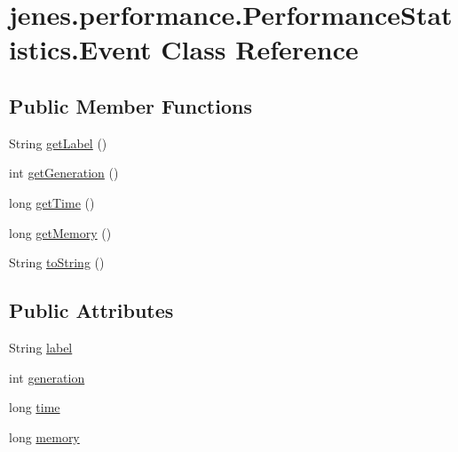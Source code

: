 \hypertarget{classjenes_1_1performance_1_1_performance_statistics_1_1_event}{\section{jenes.\-performance.\-Performance\-Statistics.\-Event Class Reference}
\label{classjenes_1_1performance_1_1_performance_statistics_1_1_event}
}
\subsection*{Public Member Functions}
\begin{DoxyCompactItemize}
\item 
String \hyperlink{classjenes_1_1performance_1_1_performance_statistics_1_1_event_a858cab2b5e60543eee0db7c95ccfe34a}{get\-Label} ()
\item 
int \hyperlink{classjenes_1_1performance_1_1_performance_statistics_1_1_event_aa71c06c2498c62e0a9aef06e0da9a3e7}{get\-Generation} ()
\item 
long \hyperlink{classjenes_1_1performance_1_1_performance_statistics_1_1_event_a2d68c852cc73a36b47cd355c6bab5e89}{get\-Time} ()
\item 
long \hyperlink{classjenes_1_1performance_1_1_performance_statistics_1_1_event_ac8407c677c5be0c8ae79c18f3b6fa46f}{get\-Memory} ()
\item 
String \hyperlink{classjenes_1_1performance_1_1_performance_statistics_1_1_event_a995f7db4cd77e8c7d7c10f82f47a90ac}{to\-String} ()
\end{DoxyCompactItemize}
\subsection*{Public Attributes}
\begin{DoxyCompactItemize}
\item 
String \hyperlink{classjenes_1_1performance_1_1_performance_statistics_1_1_event_a11b36b7e84331f1d1ad7853f7c701d0a}{label}
\item 
int \hyperlink{classjenes_1_1performance_1_1_performance_statistics_1_1_event_aa3f0eebfca2c91d549d9e60ed57aea50}{generation}
\item 
long \hyperlink{classjenes_1_1performance_1_1_performance_statistics_1_1_event_ab5ebdfbbc9a6e1f9d770bae3b18f6f85}{time}
\item 
long \hyperlink{classjenes_1_1performance_1_1_performance_statistics_1_1_event_a9cbdaa1d1ad956557e6ea39588cdc5c7}{memory}
\end{DoxyCompactItemize}


